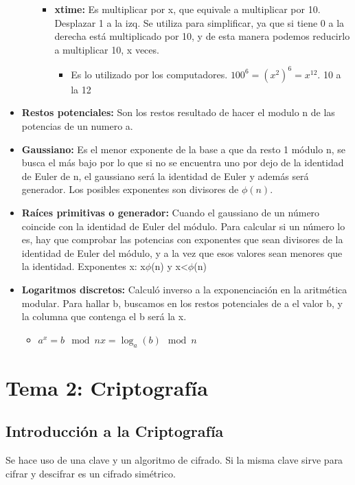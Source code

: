 \documentclass[12pt, twoside, openright]{report} %
\begin{document}
\begin{itemize}
\begin{itemize}
\begin{itemize}
			            \item \textbf{xtime:} Es multiplicar por x, que equivale a multiplicar por 10. Desplazar 1 a la izq. Se utiliza para simplificar, ya que si tiene 0 a la derecha está multiplicado por 10, y de esta manera podemos reducirlo a multiplicar 10, x veces.
			                  \begin{itemize}
				                  \item Es lo utilizado por los computadores. $100^6 = (x^2)^6=x^{12}$. 10 a la 12
			                  \end{itemize}
		            \end{itemize}
	      \end{itemize}
	\item \textbf{Restos potenciales:} Son los restos resultado de hacer el modulo n de las potencias de un numero a.
	\item \textbf{Gaussiano:} Es el menor exponente de la base a que da resto 1 módulo n, se busca el más bajo por lo que si no se encuentra uno por dejo de la identidad de Euler de n, el gaussiano será la identidad de Euler y además será generador. Los posibles exponentes son divisores de $\phi(n)$.
	\item \textbf{Raíces primitivas o generador:} Cuando el gaussiano de un número coincide con la identidad de Euler del módulo. Para calcular si un número lo es, hay que comprobar las potencias con exponentes que sean divisores de la identidad de Euler del módulo, y a la vez que esos valores sean menores que la identidad. Exponentes x: x\textbar $\phi$(n) y x\textless $\phi$(n)
	\item \textbf{Logaritmos discretos:} Calculó inverso a la exponenciación en la aritmética modular. Para hallar b, buscamos en los restos potenciales de a el valor b, y la columna que contenga el b será la x.
	      \begin{itemize}
		      \item $a^x = b \mod n x=\log_a(b) \mod n$
	      \end{itemize}
\end{itemize}

\chapter{Tema 2: Criptografía}
\section{Introducción a la Criptografía}
Se hace uso de una clave y un algoritmo de cifrado. Si la misma clave sirve para cifrar y descifrar es un cifrado simétrico.
\end{document}
